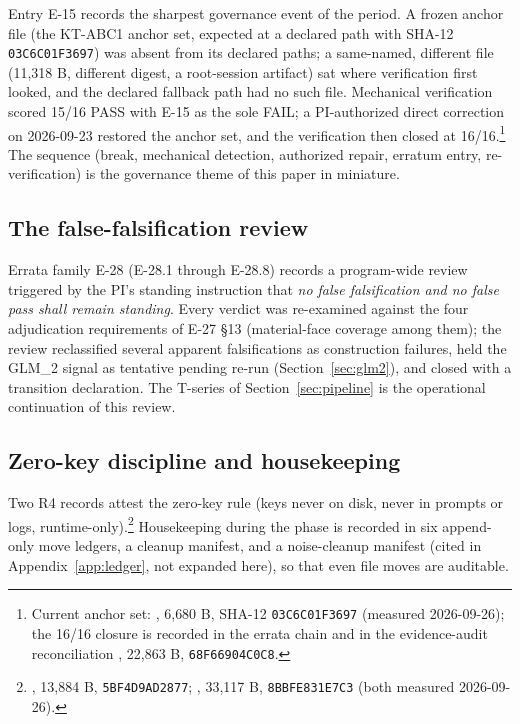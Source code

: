 \documentclass[11pt]{article}
\newcommand{\sha}[1]{\texttt{#1}}
\begin{document}
Entry E-15 records the sharpest governance event of the period. A frozen anchor file (the KT-ABC1 anchor set, expected at a declared path with SHA-12 \sha{03C6C01F3697}) was absent from its declared paths; a same-named, different file (11{,}318 B, different digest, a root-session artifact) sat where verification first looked, and the declared fallback path had no such file. Mechanical verification scored 15/16 PASS with E-15 as the sole FAIL; a PI-authorized direct correction on 2026-09-23 restored the anchor set, and the verification then closed at 16/16.\footnote{Current anchor set: , 6{,}680 B, SHA-12 \sha{03C6C01F3697} (measured 2026-09-26); the 16/16 closure is recorded in the errata chain and in the evidence-audit reconciliation , 22{,}863 B, \sha{68F66904C0C8}.} The sequence (break, mechanical detection, authorized repair, erratum entry, re-verification) is the governance theme of this paper in miniature.

\subsection{The false-falsification review}

Errata family E-28 (E-28.1 through E-28.8) records a program-wide review triggered by the PI's standing instruction that \emph{no false falsification and no false pass shall remain standing}. Every verdict was re-examined against the four adjudication requirements of E-27 \S13 (material-face coverage among them); the review reclassified several apparent falsifications as construction failures, held the GLM\_2 signal as tentative pending re-run (Section~\ref{sec:glm2}), and closed with a transition declaration. The T-series of Section~\ref{sec:pipeline} is the operational continuation of this review.

\subsection{Zero-key discipline and housekeeping}

Two R4 records attest the zero-key rule (keys never on disk, never in prompts or logs, runtime-only).\footnote{, 13{,}884 B, \sha{5BF4D9AD2877}; , 33{,}117 B, \sha{8BBFE831E7C3} (both measured 2026-09-26).} Housekeeping during the phase is recorded in six append-only move ledgers, a cleanup manifest, and a noise-cleanup manifest (cited in Appendix~\ref{app:ledger}, not expanded here), so that even file moves are auditable.
\end{document}
